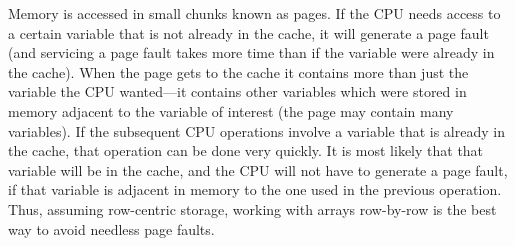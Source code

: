 Memory is accessed in small chunks known as pages.  If the CPU needs
access to a certain variable that is not already in the cache, it will
generate a page fault (and servicing a page fault takes more time than
if the variable were already in the cache).  When the page gets to the
cache it contains more than just the variable the CPU wanted---it
contains other variables which were stored in memory adjacent to the
variable of interest (the page may contain many variables).  If the
subsequent CPU operations involve a variable that is already in the
cache, that operation can be done very quickly.  It is most likely
that that variable will be in the cache, and the CPU will not have to
generate a page fault, if that variable is adjacent in memory to the
one used in the previous operation.  Thus, assuming row-centric
storage, working with arrays row-by-row is the best way to avoid
needless page faults.

